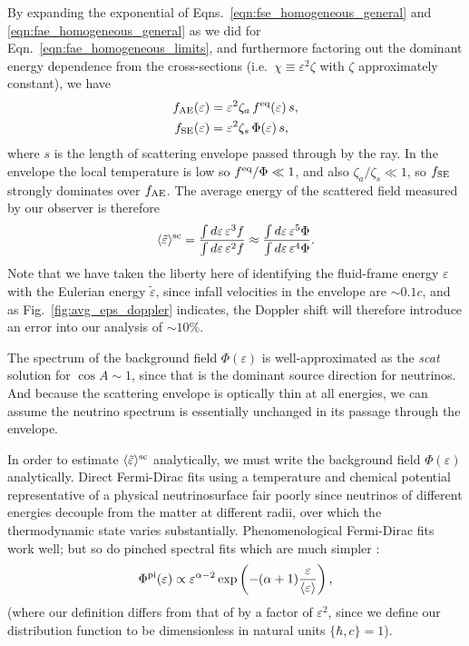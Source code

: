 \documentclass[aps,floatfix,prd,superscriptaddress,twocolumn]{revtex4-1}
\begin{document}
By expanding the exponential of
Eqns.~\ref{eqn:fse_homogeneous_general} and \ref{eqn:fae_homogeneous_general}
as we did for Eqn.~\ref{eqn:fae_homogeneous_limits},
and furthermore factoring out the dominant energy dependence from the
cross-sections (i.e.\ $\chi\equiv\varepsilon^2 \zeta$
with $\zeta$ approximately constant), we have
\begin{align}
  \label{eqn:fae_homogeneous_thin_limit}
  f_{\rm AE}(\varepsilon)
  &= \varepsilon^2 \zeta_a \,f^{\rm eq}(\varepsilon)\,s, \\
  \label{eqn:fse_homogeneous_thin_limit}
  f_{\rm SE}(\varepsilon)
  &= \varepsilon^2 \zeta_s \,\Phi(\varepsilon)\,s,
\end{align}
where $s$ is the length of scattering envelope passed through by the ray.
In the envelope the local temperature is low so $f^{\rm eq}/\Phi\ll 1$,
and also $\zeta_a/\zeta_s\ll 1$,
so $f_{\rm SE}$ strongly dominates over $f_{\rm AE}$.
The average energy of the scattered field measured by our observer
is therefore
\begin{equation}
  \label{eqn:avg_eps_sc}
  \langle \tilde{\varepsilon} \rangle^{\rm sc}
  = \frac{\int d\varepsilon\,\varepsilon^3 f}{\int d\varepsilon\,\varepsilon^2 f}
  \approx \frac{\int d\varepsilon\,\varepsilon^5 \Phi}{\int d\varepsilon\,\varepsilon^4 \Phi}.
\end{equation}
Note that we have taken the liberty here of identifying the fluid-frame energy
$\varepsilon$ with the Eulerian energy $\tilde{\varepsilon}$,
since infall velocities in the envelope are $\sim0.1c$,
and as Fig.~\ref{fig:avg_eps_doppler} indicates,
the Doppler shift will therefore introduce an error into our analysis of
$\sim10\%$.

The spectrum of the background field $\Phi(\varepsilon)$ is well-approximated
as the \emph{scat} solution for $\cos A\sim 1$, since that is the dominant
source direction for neutrinos.
And because the scattering envelope is optically thin at all energies,
we can assume the neutrino spectrum is essentially unchanged in its passage
through the envelope.

In order to estimate $\langle \tilde{\varepsilon} \rangle^{\rm sc}$ analytically,
we must write the background field $\Phi(\varepsilon)$ analytically.
Direct Fermi-Dirac fits using a temperature and chemical potential
representative of a physical neutrinosurface fair poorly since neutrinos of
different energies decouple from the matter at different radii, over which
the thermodynamic state varies substantially.
Phenomenological Fermi-Dirac fits work well;
but so do pinched spectral fits which are much simpler
\cite{keil2003-pinched_spectra,miri2016-sn_neutrinos}:
\begin{equation}
  \label{eqn:pinched_spectra}
  \Phi^{\rm pi}(\varepsilon) \propto
  \varepsilon^{\alpha-2}
  \exp\left(-(\alpha+1)\frac{\varepsilon}{\langle\varepsilon\rangle}\right),
\end{equation}
(where our definition differs from that of \cite{keil2003-pinched_spectra}
by a factor of
$\varepsilon^2$, since we define our distribution function to be dimensionless
in natural units $\{\hbar,c\}=1$).
\end{document}
